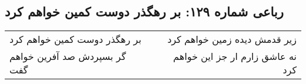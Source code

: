 \begin{center}
\section*{رباعی شماره ۱۲۹: بر رهگذر دوست کمین خواهم کرد}
\label{sec:sh129}
\begin{longtable}{l p{0.5cm} r}
بر رهگذر دوست کمین خواهم کرد
&&
زیر قدمش دیده زمین خواهم کرد
\\
گر بسپردش صد آفرین خواهم گفت
&&
نه عاشق زارم ار جز این خواهم کرد
\\
\end{longtable}
\end{center}
